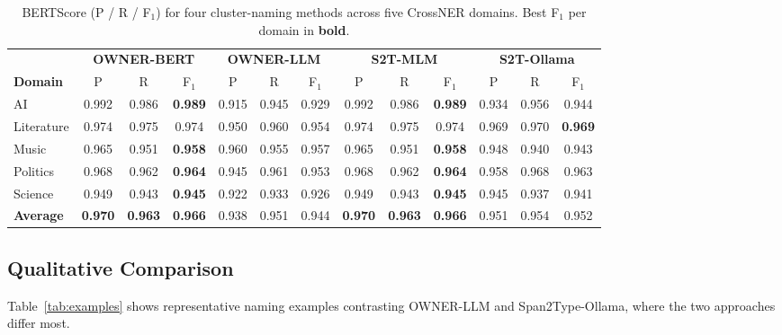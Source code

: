 \documentclass[11pt,a4paper]{article}
\begin{document}
\begin{table}[h]
\centering
\caption{BERTScore (P / R / F$_1$) for four cluster-naming methods across five
CrossNER domains. Best F$_1$ per domain in \textbf{bold}.}
\label{tab:bertscore}
\setlength{\tabcolsep}{3.5pt}
\small
\begin{tabular}{l ccc ccc ccc ccc}
\toprule
& \multicolumn{3}{c}{\cellcolor{bertcol}\textbf{OWNER-BERT}}
& \multicolumn{3}{c}{\cellcolor{llmcol}\textbf{OWNER-LLM}}
& \multicolumn{3}{c}{\cellcolor{s2tmlmcol}\textbf{S2T-MLM}}
& \multicolumn{3}{c}{\cellcolor{s2tollamacol}\textbf{S2T-Ollama}} \\
\cmidrule(lr){2-4}\cmidrule(lr){5-7}\cmidrule(lr){8-10}\cmidrule(lr){11-13}
\textbf{Domain} & P & R & F$_1$ & P & R & F$_1$ & P & R & F$_1$ & P & R & F$_1$ \\
\midrule
AI
  & 0.992 & 0.986 & \textbf{0.989}
  & 0.915 & 0.945 & 0.929
  & 0.992 & 0.986 & \textbf{0.989}
  & 0.934 & 0.956 & 0.944 \\
Literature
  & 0.974 & 0.975 & 0.974
  & 0.950 & 0.960 & 0.954
  & 0.974 & 0.975 & 0.974
  & 0.969 & 0.970 & \textbf{0.969} \\
Music
  & 0.965 & 0.951 & \textbf{0.958}
  & 0.960 & 0.955 & 0.957
  & 0.965 & 0.951 & \textbf{0.958}
  & 0.948 & 0.940 & 0.943 \\
Politics
  & 0.968 & 0.962 & \textbf{0.964}
  & 0.945 & 0.961 & 0.953
  & 0.968 & 0.962 & \textbf{0.964}
  & 0.958 & 0.968 & 0.963 \\
Science
  & 0.949 & 0.943 & \textbf{0.945}
  & 0.922 & 0.933 & 0.926
  & 0.949 & 0.943 & \textbf{0.945}
  & 0.945 & 0.937 & 0.941 \\
\midrule
\textbf{Average}
  & \textbf{0.970} & \textbf{0.963} & \textbf{0.966}
  & 0.938 & 0.951 & 0.944
  & \textbf{0.970} & \textbf{0.963} & \textbf{0.966}
  & 0.951 & 0.954 & 0.952 \\
\bottomrule
\end{tabular}
\end{table}

\subsection{Qualitative Comparison}

Table~\ref{tab:examples} shows representative naming examples contrasting
OWNER-LLM and Span2Type-Ollama, where the two approaches differ most.
\end{document}
